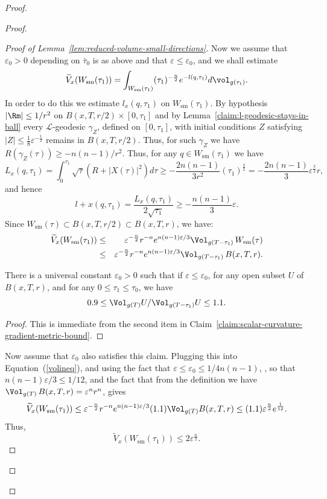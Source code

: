 \begin{proof}
\begin{proof}
\begin{proof}[Proof of Lemma~\ref{lem:reduced-volume-small-directions}]
Now we assume that $\varepsilon_0>0$ depending on $\bar\tau_0$ is as
above and that $\varepsilon\le \varepsilon_0$, and we shall estimate
$$
\widetilde V_x(W_{\mathrm{sm}}(\tau_1)) = \int_{W_{\mathrm{sm}}(\tau_1)}
(\tau_1)^{-\frac{n}{2}}e^{- l(q,\tau_1)}d\vol_{g(\tau_1)}.$$ In
order to do this we estimate $ l_x(q,\tau_1)$ on $ W_{\mathrm{sm}}(\tau_1)$. By hypothesis $|\Rm|\le 1/r^2$ on
$B(x,T,r/2)\times [0,\tau_1]$ and by Lemma~\ref{claim:l-geodesic-stays-in-ball} every
${\mathcal L}$-geodesic $\gamma_Z$, defined on $[0,\tau_1]$, with
initial conditions $Z$ satisfying $|Z|\leq
\frac{1}{8}\varepsilon^{-\frac{1}{2}}$ remains in $B(x,T,r/2)$.
Thus, for such $\gamma_Z$ we have $R(\gamma_Z(\tau))\ge
-n(n-1)/r^2$. Thus, for any $q\in W_{\mathrm{sm}}(\tau_1)$ we have
$$ L_x(q,\tau_1) =
\int_{0}^{\tau_1}\sqrt{\tau}(R+|X(\tau)|^{2})d \tau \geq
-\frac{2n(n-1)}{3r^{2}}(\tau_1)^{\frac{3}{2}}=
-\frac{2n(n-1)}{3}\varepsilon^{\frac{3}{2}}r,$$ and hence
$$l+x(q,\tau_1)=\frac{L_x(q,\tau_1)}{2\sqrt{\tau_1}}\ge -\frac{n(n-1)}{3}\varepsilon.$$ Since $W_{\mathrm{sm}}(\tau)\subset B(x,T,r/2)\subset B(x,T,r)$, we have:
\begin{eqnarray}\label{volineq}
 \widetilde V_x(W_{\mathrm{sm}}(\tau_1)) & \leq &
\varepsilon^{-\frac{n}{2}}r^{-n}e^{n(n-1)\varepsilon/3}\Vol_{g(T-\tau_1)}\, W_{\mathrm{sm}}(\tau) \\
& \le & \varepsilon^{-\frac{n}{2}}r^{-n}e^{n(n-1)\varepsilon/3}\Vol_{g(T-\tau_1)}\,B(x,T,r).\nonumber\end{eqnarray}








\begin{claim}\label{claim:volume-comparison-time-slices}
\label{volvomp}
There is a universal constant $\varepsilon_0>0$ such that if
$\varepsilon\le \varepsilon_0$, for any open subset $U$ of
$B(x,T,r)$, and for any $0\le \tau_1\le \tau_0$, we have
$$0.9\le \Vol_{g(T)}U/\Vol_{g(T-\tau_1)}U\le 1.1.$$
\end{claim}


\begin{proof}
This is immediate from the second item in Claim~\ref{claim:scalar-curvature-gradient-metric-bound}.
\end{proof}

Now assume that $\varepsilon_0$ also satisfies this claim. Plugging
this into Equation~(\ref{volineq}), and using the fact that
$\varepsilon\le \varepsilon_0\le 1/4n(n-1)$, , so that
$n(n-1)\varepsilon/3\le 1/12$, and the fact that from the definition
we have $\Vol_{g(T)}\,B(x,T,r)=\varepsilon^nr^n$, gives
$$\widetilde V_x(W_{\mathrm{sm}}(\tau_1))\leq \varepsilon^{-\frac{n}{2}}r^{-n}e^{n(n-1)\varepsilon/3}
(1.1)\Vol_{g(T)}B(x,T,r)\le(1.1)
\varepsilon^{\frac{n}{2}}e^{\frac{1}{12}}.$$ Thus,
$$\widetilde V_x(W_{\mathrm{sm}}(\tau_1))\le
2\varepsilon^{\frac{n}{2}}.$$


\end{proof}
\end{proof}
\end{proof}
